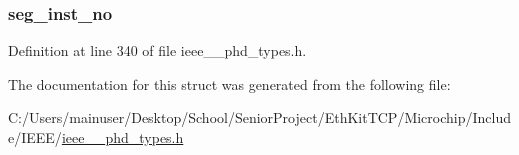 \hypertarget{struct___segment_info_adf7e08dd5bd0cc5b6bdd34f692c64f24}{}
\subsubsection[{seg\+\_\+inst\+\_\+no}]{ seg\+\_\+inst\+\_\+no}\label{struct___segment_info_adf7e08dd5bd0cc5b6bdd34f692c64f24}


Definition at line 340 of file ieee\+\_\+\_\+phd\+\_\+types.\+h.



The documentation for this struct was generated from the following file\+:\begin{DoxyCompactItemize}
\item 
C\+:/\+Users/mainuser/\+Desktop/\+School/\+Senior\+Project/\+Eth\+Kit\+T\+C\+P/\+Microchip/\+Include/\+I\+E\+E\+E/\hyperlink{ieee__11073__phd__types_8h}{ieee\+\_\+\_\+phd\+\_\+types.\+h}\end{DoxyCompactItemize}
